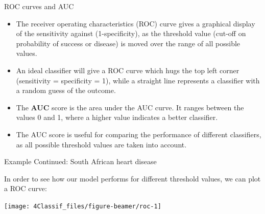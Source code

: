 \documentclass[10pt,ignorenonframetext,]{beamer}
\begin{document}
\begin{frame}

\begin{block}{ROC curves and AUC}

\vspace{2mm}

\begin{itemize}
\item
  The receiver operating characteristics (ROC) curve gives a graphical
  display of the sensitivity against (1-specificity), as the threshold
  value (cut-off on probability of success or disease) is moved over the
  range of all possible values.
\item
  An ideal classifier will give a ROC curve which hugs the top left
  corner (sensitivity = specificity = 1), while a straight line
  represents a classifier with a random guess of the outcome.
\item
  The \textbf{AUC} score is the area under the AUC curve. It ranges
  between the values 0 and 1, where a higher value indicates a better
  classifier.
\item
  The AUC score is useful for comparing the performance of different
  classifiers, as all possible threshold values are taken into account.
\end{itemize}

\end{block}

\end{frame}

\begin{frame}

\begin{block}{Example Continued: South African heart disease}

In order to see how our model performs for different threshold values,
we can plot a ROC curve:

\scriptsize

\begin{center}\texttt{[image: 4Classif\_files/figure-beamer/roc-1]} \end{center}

\end{block}

\end{frame}
\end{document}
